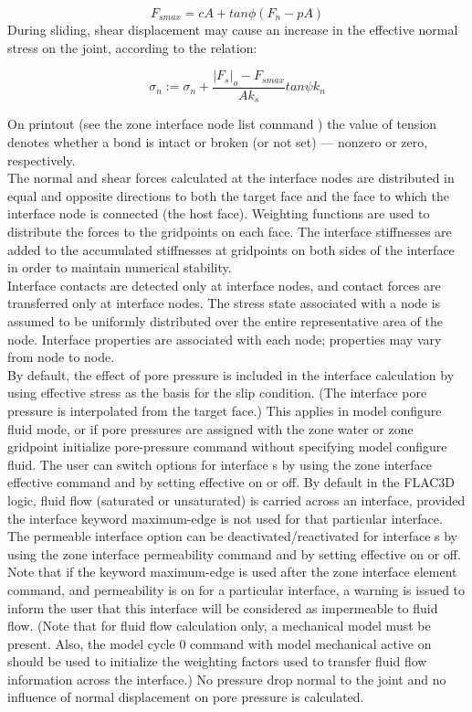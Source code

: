 \documentclass[a4paper, nobind]{templates/ociamthesis}
\begin{document}
\[ F_{smax} = c A + tan\phi (F_n - pA)\] During sliding, shear
displacement may cause an increase in the effective normal stress on the
joint, according to the relation:

\[\sigma_n := \sigma_n + \frac{|F_s|_o - F_{smax}}{A k_s} tan\psi k_n\]

On printout (see the zone interface node list command ) the value of
tension denotes whether a bond is intact or broken (or not set) ---
nonzero or zero, respectively.\\

The normal and shear forces calculated at the interface nodes are
distributed in equal and opposite directions to both the target face and
the face to which the interface node is connected (the host face).
Weighting functions are used to distribute the forces to the gridpoints
on each face. The interface stiffnesses are added to the accumulated
stiffnesses at gridpoints on both sides of the interface in order to
maintain numerical stability.\\

Interface contacts are detected only at interface nodes, and contact
forces are transferred only at interface nodes. The stress state
associated with a node is assumed to be uniformly distributed over the
entire representative area of the node. Interface properties are
associated with each node; properties may vary from node to node.\\

By default, the effect of pore pressure is included in the interface
calculation by using effective stress as the basis for the slip
condition. (The interface pore pressure is interpolated from the target
face.) This applies in model configure fluid mode, or if pore pressures
are assigned with the zone water or zone gridpoint initialize
pore-pressure command without specifying model configure fluid. The user
can switch options for interface s by using the zone interface effective
command and by setting effective on or off. By default in the FLAC3D
logic, fluid flow (saturated or unsaturated) is carried across an
interface, provided the interface keyword maximum-edge is not used for
that particular interface. The permeable interface option can be
deactivated/reactivated for interface s by using the zone interface
permeability command and by setting effective on or off. Note that if
the keyword maximum-edge is used after the zone interface element
command, and permeability is on for a particular interface, a warning is
issued to inform the user that this interface will be considered as
impermeable to fluid flow. (Note that for fluid flow calculation only, a
mechanical model must be present. Also, the model cycle 0 command with
model mechanical active on should be used to initialize the weighting
factors used to transfer fluid flow information across the interface.)
No pressure drop normal to the joint and no influence of normal
displacement on pore pressure is calculated.\\
\end{document}
